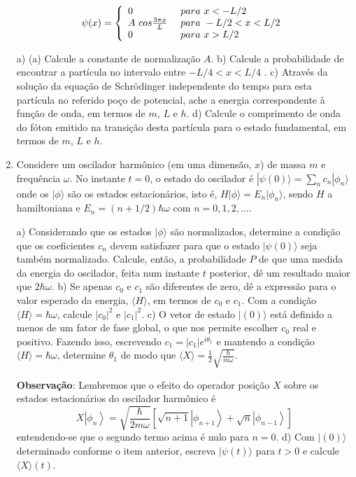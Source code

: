 \begin{enumerate}[start=1,label={\bfseries Q\arabic*.}]
$$
\psi(x) = \left\{\begin{array}{l l l} 0  \  & para \ x < - L/2 \\     A \ cos \frac{3\pi x}{L}  \ & para \ -L/2 < x < L/2  \\ 0 \ & para \ x > L/2 \end{array}\right.
$$


  a) (a) Calcule a constante de normalização $A$.
  b) Calcule a probabilidade de encontrar a partícula no intervalo entre $-L/4 < x < L/4$ .
  c) Através da solução da equação de Schrödinger independente do tempo para esta partícula no referido poço de potencial, ache a energia correspondente à função de onda, em termos de $m$, $L$ e $h$.
  d) Calcule o comprimento de onda do fóton emitido na transição desta partícula para o estado fundamental, em termos de $m$, $L$ e $h$.





\item Considere um oscilador harmônico (em uma dimensão, $x$) de massa $m$ e frequência $\omega$. No instante $t = 0$, o estado do oscilador é $| \psi (0)\rangle = \sum_{n} c_{n} |\phi_{n}\rangle$ onde os $|\phi \rangle$ são os estados estacionários, isto é, $H | \phi \rangle = E_{n}| \phi_{n} \rangle $, sendo $H$ a hamiltoniana e $E_{n} = (n + 1/2)\hbar \omega$ com $n = 0,1,2,...$.


  a) Considerando que os estados $|\phi \rangle$ são normalizados, determine a condição que os coeficientes $c_{n}$ devem satisfazer para que o estado $| \psi (0)\rangle$ seja também normalizado. Calcule, então, a probabilidade $P$ de que uma medida da energia do oscilador, feita num instante $t$ posterior, dê um resultado maior que $2\hbar \omega$.
  b) Se apenas $c_{0}$ e $c_{1}$ são diferentes de zero, dê a expressão para o valor esperado da energia, $\langle H \rangle$, em termos de $c_{0}$ e $c_{1}$. Com a condição $\langle H \rangle = \hbar \omega$, calcule $|c_{0}|^{2}$ e $|c_{1}|^{2}$.
  c) O vetor de estado $|(0)\rangle$ está definido a menos de um fator de fase global, o que nos permite escolher $c_{0}$ real e positivo. Fazendo isso, escrevendo $c_{1} = |c_{1}|e^{i \theta_{1}}$ e mantendo a condição $\langle H \rangle = \hbar \omega$, determine $\theta_{1}$ de modo que $ \langle X \rangle = \frac{1}{2} \sqrt{\frac{\hbar}{m\omega}}$.

      \textbf{Observação}: Lembremos que o efeito do operador posição $X$ sobre os estados estacionários do oscilador harmônico é
        $$
        X\left|\phi_{n}\right\rangle=\sqrt{\frac{\hbar}{2 m \omega}}\left[\sqrt{n+1}\left|\phi_{n+1}\right\rangle+\sqrt{n}\left|\phi_{n-1}\right\rangle\right]
        $$
      entendendo-se que o segundo termo acima é nulo para $n = 0$.
  d) Com $| (0) \rangle$ determinado conforme o item anterior, escreva $|\psi(t) \rangle$ para $t > 0$ e calcule $\langle X \rangle (t)$.





\end{enumerate}
